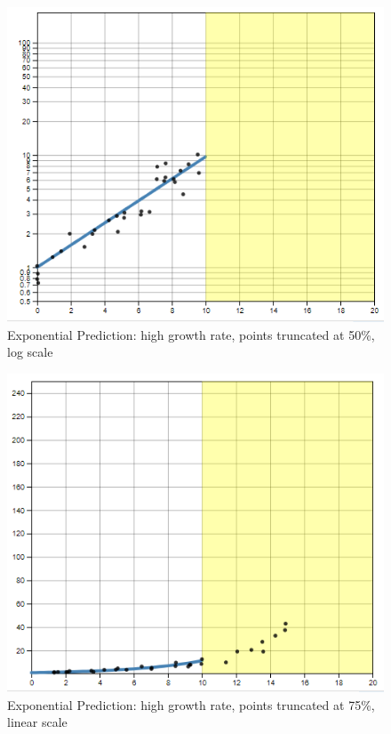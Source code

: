 \documentclass[print]{nuthesis}
\begin{document}
\begin{figure}[tbp]

{\centering \includegraphics[width=0.65\linewidth,]{images/high-10-log} 

}

\caption{Exponential Prediction: high growth rate, points truncated at 50\%, log scale}\label{fig:high-10-log}
\end{figure}

\begin{figure}[tbp]

{\centering \includegraphics[width=0.65\linewidth,]{images/high-15-linear} 

}

\caption{Exponential Prediction: high growth rate, points truncated at 75\%, linear scale}\label{fig:high-15-linear}
\end{figure}
\end{document}
